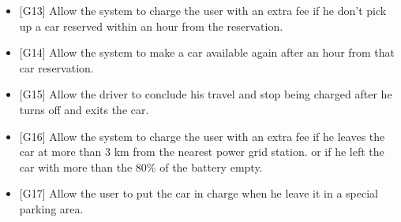 \begin{itemize}
	\item {[}G13{]} Allow the system to charge the user with an extra fee if he don't pick up a car reserved within an hour from the reservation.
	\item {[}G14{]} Allow the system to make a car available again after an hour from that car reservation.
	\item {[}G15{]} Allow the driver to conclude his travel and stop being charged after he turns off and exits the car.
	\item {[}G16{]} Allow the system to charge the user with an extra fee if he leaves the car at more than 3 km from the nearest power grid station. 
	or if he left the car with more than the 80\% of the battery empty.
	\item {[}G17{]} Allow the user to put the car in charge when he leave it in a special parking area.
\end{itemize}



\pagebreak{}


